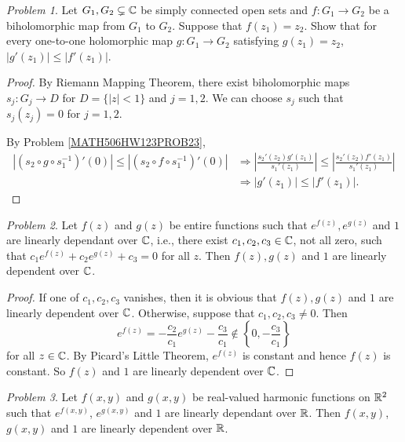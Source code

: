 \documentclass[11pt]{amsart}
\theoremstyle{remark}
\newtheorem{prob}{Problem}[section]
\theoremstyle{definition}
\numberwithin{equation}{section}
\begin{document}
\begin{prob}
    Let $G_1, G_2\subsetneq {\mathbb C}$ be simply connected open sets
    and $f: G_1\to G_2$ be a biholomorphic map from $G_1$ to $G_2$. Suppose that $f(z_1) = z_2$. Show that for every one-to-one holomorphic map $g: G_1\to G_2$ satisfying $g(z_1) = z_2$,
    $|g'(z_1)| \le |f'(z_1)|$.
\end{prob}

\begin{proof}
    By Riemann Mapping Theorem, there exist biholomorphic maps $s_j: G_j \to D$
    for $D= \{|z|< 1\}$ and $j=1,2$. We can choose $s_j$ such that $s_j(z_j) = 0$ for $j=1,2$.

    By Problem \ref{MATH506HW123PROB23},
    \[
        \begin{aligned}
            |(s_2\circ g \circ s_1^{-1})'(0)|\le |(s_2\circ f \circ s_1^{-1})'(0)|
             & \Rightarrow \left|\frac{s_2'(z_2) g'(z_1)}{s_1'(z_1)}\right|
            \le \left|\frac{s_2'(z_2) f'(z_1)}{s_1'(z_1)}\right|
            \\
             & \Rightarrow |g'(z_1)| \le |f'(z_1)|.
        \end{aligned}
    \]
\end{proof}

\begin{prob}
    Let $f(z)$ and $g(z)$ be entire functions such that
    $e^{f(z)},  e^{g(z)}$ and $1$ are linearly dependant over ${\mathbb C}$, i.e., there exist $c_1, c_2, c_3\in {\mathbb C}$, not all zero,
    such that $c_1 e^{f(z)} + c_2 e^{g(z)} + c_3 = 0$ for all $z$.
    Then $f(z), g(z)$ and $1$ are linearly dependent over ${\mathbb C}$.
\end{prob}

\begin{proof}
    If one of $c_1,c_2,c_3$ vanishes, then it is obvious that $f(z),g(z)$ and $1$ are linearly dependent over ${\mathbb C}$. Otherwise, suppose that $c_1,c_2,c_3\ne 0$. Then
    \[
        e^{f(z)} = -\frac{c_2}{c_1} e^{g(z)} - \frac{c_3}{c_1}\not\in \left\{0, -\frac{c_3}{c_1}\right\}
    \]
    for all $z\in {\mathbb C}$. By Picard's Little Theorem, $e^{f(z)}$ is constant and hence $f(z)$ is constant. So $f(z)$ and $1$ are linearly dependent over ${\mathbb C}$.
\end{proof}

\begin{prob}
    Let $f(x,y)$ and $g(x,y)$ be real-valued harmonic functions on ${\mathbb R}^2$ such that
    $e^{f(x,y)}$, $e^{g(x,y)}$ and $1$ are linearly dependant over ${\mathbb R}$. Then
    $f(x,y)$, $g(x,y)$ and $1$ are linearly dependent over ${\mathbb R}$.
\end{prob}
\end{document}
